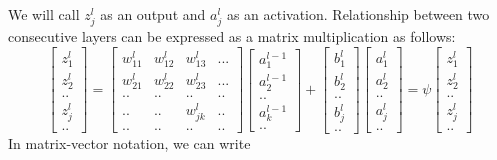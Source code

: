 \documentclass[12pt]{article}
\begin{document}
We will call $z_{j}^{l}$ as an output and $a_{j}^{l}$ as an activation. Relationship between two consecutive layers can be expressed as a matrix multiplication as follows:
\begin{subequations}
\begin{equation}
\begin{bmatrix} 
z_{1}^{l}  \\
z_{2}^{l} \\
..  \\
z_{j}^{l} \\
..
\end{bmatrix} 
=
\begin{bmatrix} 
w_{11}^{l} & w_{12}^{l} & w_{13}^{l} & ... \\
w_{21}^{l} & w_{22}^{l} & w_{23}^{l} & ... \\
.. & .. & .. & .. \\
..& .. &  w_{jk}^{l} & .. \\
..& .. & .. & ..
\end{bmatrix}
\begin{bmatrix} 
a_{1}^{l-1}  \\
a_{2}^{l-1} \\
..  \\
a_{k}^{l-1} \\
..
\end{bmatrix} 
+
\begin{bmatrix} 
b_{1}^{l}  \\
b_{2}^{l} \\
..  \\
b_{j}^{l} \\
..
\end{bmatrix} 
\end{equation}

\begin{equation}
\begin{bmatrix} 
a_{1}^{l}  \\
a_{2}^{l} \\
..  \\
a_{j}^{l} \\
..
\end{bmatrix} 
=
\psi
\begin{bmatrix} 
z_{1}^{l}  \\
z_{2}^{l} \\
..  \\
z_{j}^{l} \\
..
\end{bmatrix} 
\end{equation}
\end{subequations}
In matrix-vector notation, we can write 
\end{document}
